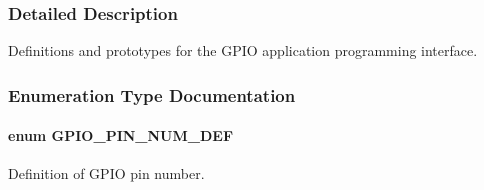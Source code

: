 \subsubsection{Detailed Description}
Definitions and prototypes for the G\+P\+IO application programming interface. 



\subsubsection{Enumeration Type Documentation}
\paragraph[{\texorpdfstring{G\+P\+I\+O\+\_\+\+P\+I\+N\+\_\+\+N\+U\+M\+\_\+\+D\+EF}{GPIO_PIN_NUM_DEF}}]{\setlength{\rightskip}{0pt plus 5cm}enum {\bf G\+P\+I\+O\+\_\+\+P\+I\+N\+\_\+\+N\+U\+M\+\_\+\+D\+EF}}\hypertarget{group___g_p_i_o_ga92de7c3421c2bc82f5e88b4303991d1d}{}\label{group___g_p_i_o_ga92de7c3421c2bc82f5e88b4303991d1d}


Definition of G\+P\+IO pin number. 

